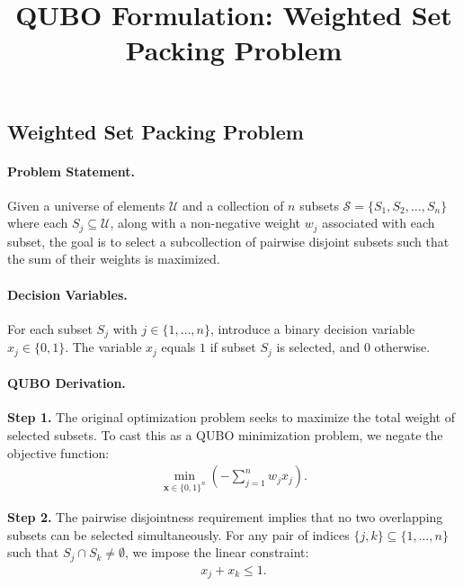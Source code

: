 \documentclass[12pt]{article}
\title{QUBO Formulation: Weighted Set Packing Problem}
\date{}
\begin{document}
\maketitle

\subsection*{Weighted Set Packing Problem}

\paragraph{Problem Statement.}
Given a universe of elements $\mathcal{U}$ and a collection of $n$ subsets $\mathcal{S} = \{S_1, S_2, \dots, S_n\}$ where each $S_j \subseteq \mathcal{U}$, along with a non-negative weight $w_j$ associated with each subset, the goal is to select a subcollection of pairwise disjoint subsets such that the sum of their weights is maximized.

\paragraph{Decision Variables.}
For each subset $S_j$ with $j \in \{1, \dots, n\}$, introduce a binary decision variable $x_j \in \{0, 1\}$. The variable $x_j$ equals $1$ if subset $S_j$ is selected, and $0$ otherwise.

\paragraph{QUBO Derivation.}
\textbf{Step 1.} The original optimization problem seeks to maximize the total weight of selected subsets. To cast this as a QUBO minimization problem, we negate the objective function:
\begin{align}
\min_{\mathbf{x} \in \{0,1\}^n} \left( -\sum_{j=1}^{n} w_j x_j \right).
\end{align}

\textbf{Step 2.} The pairwise disjointness requirement implies that no two overlapping subsets can be selected simultaneously. For any pair of indices $\{j,k\} \subseteq \{1, \dots, n\}$ such that $S_j \cap S_k \neq \emptyset$, we impose the linear constraint:
\begin{align}
x_j + x_k \le 1.
\end{align}
\end{document}

